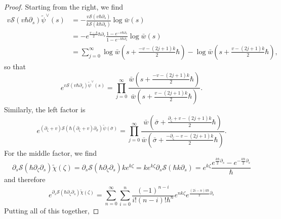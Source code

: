 \documentclass[10pt,a4paper,oneside,no-math,reqno]{amsart}%
\theoremstyle{plain}
\theoremstyle{definition}
\theoremstyle{remark}
\numberwithin{equation}{section}
\newcommand{\mc}[1]{\mathcal{#1}}
\newcommand{\1}{\mathds{1}}
\newcommand{\<}{\langle}
\renewcommand{\>}{\rangle}
\newcommand{\del}{\partial}
\begin{document}
\begin{proof}
	Starting from the right, we find
	\begin{equation}
		\begin{split}
			v \mc{S}(v \hbar \del_s ) \tilde{\psi}^\vee (s)
			&=
			- \frac{v \mc{S}(v \hbar \del_s )}{k \mc{S}( k \hbar \del_s )} \log \bar{w} (s)
			\\
			&=
			- e^{\frac{v-k}{2} \hbar \del_s} \frac{1 - e^{-v \hbar \del_s }}{1 - e^{-k \hbar \del_s }} \log \bar{w} (s)
			\\
			&=
			\sum_{j = 0}^ \infty \log \bar{w} (s + \frac{-v- (2j + 1) k}{2} \hbar) -\log \bar{w} (s + \frac{v- (2j + 1) k}{2} \hbar) ,
		\end{split}
	\end{equation}
	so that
	\begin{equation}
		e^{v \mc{S}(v \hbar \del_s) \tilde{\psi}^\vee (s)}
		=
		\prod_{j = 0}^ \infty  \frac{\bar{w} (s + \frac{-v- (2j + 1) k}{2} \hbar)}{\bar{w} (s + \frac{v- (2j + 1) k}{2} \hbar)} .
	\end{equation}
	Similarly, the left factor is
	\begin{equation}
		e^{ (\del_\zeta+v) \mc{S}( \hbar (\del_\zeta + v) \del_{\bar{\sigma}} )\tilde{\psi} (\bar{\sigma}) }
		=
		\prod_{j = 0}^ \infty  \frac{\bar{w} ( \bar{\sigma} + \frac{\del_\zeta + v- (2j + 1) k}{2} \hbar)}{\bar{w} ( \bar{\sigma} + \frac{- \del_\zeta -v- (2j + 1) k}{2} \hbar)} .
	\end{equation}
	For the middle factor, we find
	\begin{equation}
		\del_s \mc{S}( \hbar \del_\zeta \del_s ) \tilde{\chi} (\zeta )
		=
		\del_s \mc{S}( \hbar \del_\zeta \del_s) k e^{k\zeta}
		=
		k e^{k\zeta} \del_s \mc{S}( \hbar k \del_s)
		=
		e^{k\zeta}  \frac{e^{\frac{k \hbar}{2} \del_s} - e^{- \frac{k\hbar}{2} \del_s}}{\hbar}
	\end{equation}
	and therefore
	\begin{equation}
		e^{\del_s \mc{S}( \hbar \del_\zeta \del_s)\tilde{\chi} (\zeta)}
		=
		\sum_{n=0}^\infty \sum_{i = 0}^n \frac{(-1)^{n-i}}{i!(n-i)!\hbar^n} e^{nk\zeta}  e^{\frac{(2i-n)k \hbar}{2} \del_s} 
	\end{equation}
	Putting all of this together,

\end{proof}
\end{document}
